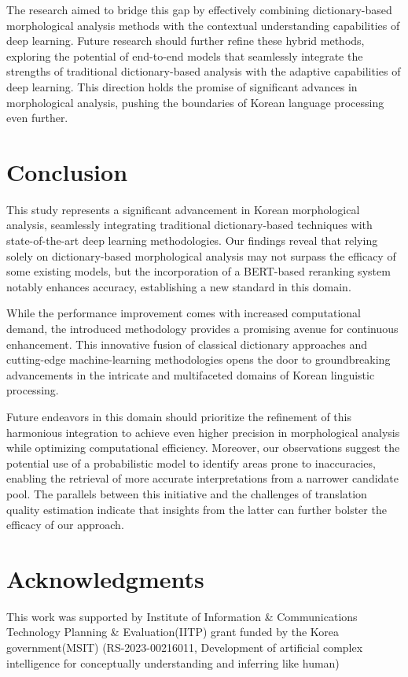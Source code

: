 \documentclass[AMS,STIX2COL]{WileyNJD-v2}
\begin{document}
    The research aimed to bridge this gap by effectively combining dictionary-based morphological analysis methods with the contextual understanding capabilities of deep learning.
    Future research should further refine these hybrid methods, exploring the potential of end-to-end models that seamlessly integrate the strengths of traditional dictionary-based analysis with the adaptive capabilities of deep learning.
    This direction holds the promise of significant advances in morphological analysis, pushing the boundaries of Korean language processing even further.


    \section{Conclusion}\label{sec:conclusion}

    This study represents a significant advancement in Korean morphological analysis, seamlessly integrating traditional dictionary-based techniques with state-of-the-art deep learning methodologies.
    Our findings reveal that relying solely on dictionary-based morphological analysis may not surpass the efficacy of some existing models, but the incorporation of a BERT-based reranking system notably enhances accuracy, establishing a new standard in this domain.

    While the performance improvement comes with increased computational demand, the introduced methodology provides a promising avenue for continuous enhancement.
    This innovative fusion of classical dictionary approaches and cutting-edge machine-learning methodologies opens the door to groundbreaking advancements in the intricate and multifaceted domains of Korean linguistic processing.

    Future endeavors in this domain should prioritize the refinement of this harmonious integration to achieve even higher precision in morphological analysis while optimizing computational efficiency.
    Moreover, our observations suggest the potential use of a probabilistic model to identify areas prone to inaccuracies, enabling the retrieval of more accurate interpretations from a narrower candidate pool.
    The parallels between this initiative and the challenges of translation quality estimation indicate that insights from the latter can further bolster the efficacy of our approach.


    \section*{Acknowledgments}
    This work was supported by Institute of Information \& Communications Technology Planning \& Evaluation(IITP) grant funded by the Korea government(MSIT) (RS-2023-00216011, Development of artificial complex intelligence for conceptually understanding and inferring like human)


    
\end{document}
